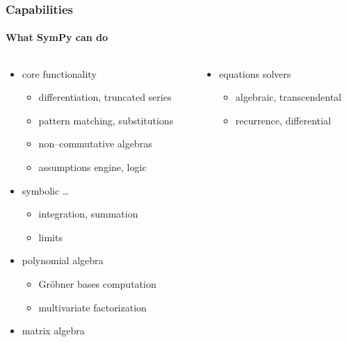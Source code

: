 \documentclass[handout]{beamer}
\begin{document}
\begin{frame}[fragile]
    \frametitle{Capabilities}
    \framesubtitle{What SymPy can do}

    \begin{columns}
        \begin{column}[l]{0.5\textwidth}
            \begin{itemize}
                \item core functionality
                    \begin{itemize}
                        \item differentiation, truncated series
                        \item pattern matching, substitutions
                        \item non--commutative algebras
                        \item assumptions engine, logic
                    \end{itemize}
                \item symbolic \ldots
                    \begin{itemize}
                        \item integration, summation
                        \item limits
                    \end{itemize}
                \item polynomial algebra
                    \begin{itemize}
                        \item Gröbner bases computation
                        \item multivariate factorization
                    \end{itemize}
                \item matrix algebra
            \end{itemize}
        \end{column}
        \begin{column}[r]{0.5\textwidth}
            \begin{itemize}
                \item equations solvers
                    \begin{itemize}
                        \item algebraic, transcendental
                        \item recurrence, differential
                    \end{itemize}

\end{itemize}
\end{column}
\end{columns}
\end{frame}
\end{document}
